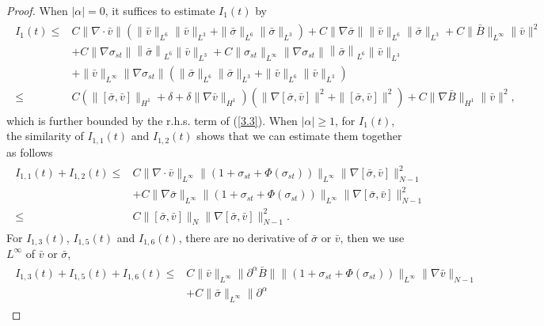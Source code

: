 \documentclass[11pt]{amsart}
\numberwithin{equation}{section}
\begin{document}
\begin{proof}
When $|\alpha|=0$, it suffices to estimate $I_{1}(t)$ by
\begin{eqnarray*}
\begin{aligned}
 I_{1}(t)\leq &C \|\nabla \cdot \bar{v}\|(\|\bar{v}\|_{L^{6}}\|\bar{v}\|_{L^{3}}
 +\|\bar{\sigma}\|_{L^{6}}\|\bar{\sigma}\|_{L^{3}})
 +C \|\nabla \bar{\sigma}\|\|\bar{v}\|_{L^{6}}\|\bar{\sigma}\|_{L^{3}}
 +C \|\bar{B}\|_{L^{\infty}}\|\bar{v}\|^{2}\\
  &+C \|\nabla\sigma_{st}\|\left\|\bar{\sigma}\right\|_{L^{6}}
 \|\bar{v}\|_{L^3}+C\|\sigma_{st}\|_{L^{\infty}}\|\nabla\sigma_{st}\|\left\|\bar{\sigma}\right\|_{L^{6}}
 \|\bar{v}\|_{L^3}\\
  &+\|\bar{v}\|_{L^{\infty}}
  \|\nabla\sigma_{st}\|(\|\bar{\sigma}\|_{L^{6}}\|\bar{\sigma}\|_{L^{3}}
  +\|\bar{v}\|_{L^{6}}\|\bar{v}\|_{L^{3}})
  \\
  \leq & C (\|[\bar{\sigma},\bar{v}]\|_{H^{1}}+\delta+\delta\|\nabla\bar{v}\|_{H^1})(\|\nabla
  [\bar{\sigma},\bar{v}]\|^{2}+\|[\bar{\sigma},\bar{v}]\|^{2})+ C \|\nabla
  \bar{B}\|_{H^{1}}\|\bar{v}\|^{2},
 \end{aligned}
\end{eqnarray*}
which is further bounded by the r.h.s. term of (\ref{3.3}). When
$|\alpha|\geq 1$, for $I_{1}(t)$, the similarity of $I_{1,1}(t)$ and
$I_{1,2}(t)$ shows that we can estimate them together as follows
\begin{eqnarray*}
\begin{aligned}
I_{1,1}(t)+I_{1,2}(t)\leq & C
\|\nabla\cdot\bar{v}\|_{L^{\infty}}\|(1+\sigma_{st}+\Phi(\sigma_{st}))\|_{L^{\infty}}
\|\nabla[\bar{\sigma},\bar{v}]\|_{N-1}^2\\
&+C\|\nabla\bar{\sigma}\|_{L^{\infty}}\|(1+\sigma_{st}+\Phi(\sigma_{st}))\|_{L^{\infty}}
\|\nabla[\bar{\sigma},\bar{v}]\|_{N-1}^2\\
\leq & C
\|[\bar{\sigma},\bar{v}]\|_{N}\|\nabla[\bar{\sigma},\bar{v}]\|_{N-1}^2.
 \end{aligned}
\end{eqnarray*}
For $I_{1,3}(t)$, $I_{1,5}(t)$ and $I_{1,6}(t)$, there are no
derivative of $\bar{\sigma}$ or $\bar{v}$, then we use $L^{\infty}$
of $\bar{v}$ or $\bar{\sigma}$,
\begin{eqnarray*}
\begin{aligned}
I_{1,3}(t)+I_{1,5}(t)+I_{1,6}(t)\leq & C
\|\bar{v}\|_{L^{\infty}}\|\partial^{\alpha}
\bar{B}\|\|(1+\sigma_{st}+\Phi(\sigma_{st}))\|_{L^{\infty}}
\|\nabla\bar{v}\|_{N-1}\\
&+C \|\bar{\sigma}\|_{L^{\infty}}\|\partial^{\alpha}

\end{aligned}
\end{eqnarray*}
\end{proof}
\end{document}
